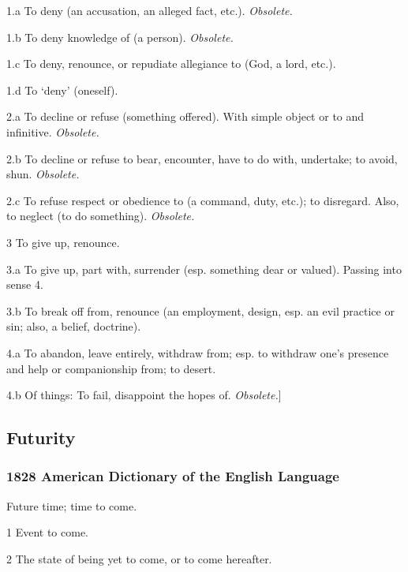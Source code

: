 			\begin{compactitem}
				\item[1.a] To deny (an accusation, an alleged fact, etc.). \textit{Obsolete.}
				\item[1.b] To deny knowledge of (a person). \textit{Obsolete.}
				\item[1.c] To deny, renounce, or repudiate allegiance to (God, a lord, etc.). 
				\item[1.d] To `deny' (oneself).
				\item[2.a] To decline or refuse (something offered). With simple object or to and infinitive. \textit{Obsolete.}
				\item[2.b] To decline or refuse to bear, encounter, have to do with, undertake; to avoid, shun. \textit{Obsolete.}
				\item[2.c] To refuse respect or obedience to (a command, duty, etc.); to disregard. Also, to neglect (to do something). \textit{Obsolete.}
				\item[3] To give up, renounce.
				\item[3.a] To give up, part with, surrender (esp. something dear or valued). Passing into sense 4.
				\item[3.b] To break off from, renounce (an employment, design, esp. an evil practice or sin; also, a belief, doctrine). 
				\item[4.a] To abandon, leave entirely, withdraw from; esp. to withdraw one's presence and help or companionship from; to desert.
				\item[4.b] Of things: To fail, disappoint the hopes of. \textit{Obsolete.}]
			\end{compactitem}

	\subsection{Futurity} %
		\label{FUTURITY}
		
		\subsubsection{1828 American Dictionary of the English Language}
		
			\begin{compactitem}
				\item Future time; time to come.
				\item[1] Event to come.
				\item[2] The state of being yet to come, or to come hereafter.
			\end{compactitem}

